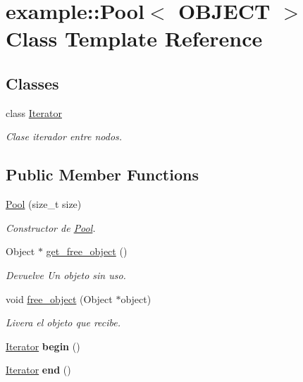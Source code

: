 \hypertarget{classexample_1_1_pool}{}\section{example\+::Pool$<$ O\+B\+J\+E\+CT $>$ Class Template Reference}
\label{classexample_1_1_pool}
\subsection*{Classes}
\begin{DoxyCompactItemize}
\item 
class \mbox{\hyperlink{classexample_1_1_pool_1_1_iterator}{Iterator}}
\begin{DoxyCompactList}\small\item\em Clase iterador entre nodos. \end{DoxyCompactList}\end{DoxyCompactItemize}
\subsection*{Public Member Functions}
\begin{DoxyCompactItemize}
\item 
\mbox{\hyperlink{classexample_1_1_pool_a89e3934cca6a84b88826c9ab43835162}{Pool}} (size\+\_\+t size)
\begin{DoxyCompactList}\small\item\em Constructor de \mbox{\hyperlink{classexample_1_1_pool}{Pool}}. \end{DoxyCompactList}\item 
Object $\ast$ \mbox{\hyperlink{classexample_1_1_pool_a0456b908b50255679dfa5d58939e97c6}{get\+\_\+free\+\_\+object}} ()
\begin{DoxyCompactList}\small\item\em Devuelve Un objeto sin uso. \end{DoxyCompactList}\item 
void \mbox{\hyperlink{classexample_1_1_pool_a4bfcdfeaf2685168c0a8ffc471fb0578}{free\+\_\+object}} (Object $\ast$object)
\begin{DoxyCompactList}\small\item\em Livera el objeto que recibe. \end{DoxyCompactList}\item 
\mbox{\label{classexample_1_1_pool_af7959dd8e2b9bfdbb47bfcefb670b387}} 
\mbox{\hyperlink{classexample_1_1_pool_1_1_iterator}{Iterator}} {\bfseries begin} ()
\item 
\mbox{\label{classexample_1_1_pool_a867c9f26681fbc92e154e3bb1111b252}} 
\mbox{\hyperlink{classexample_1_1_pool_1_1_iterator}{Iterator}} {\bfseries end} ()
\end{DoxyCompactItemize}


